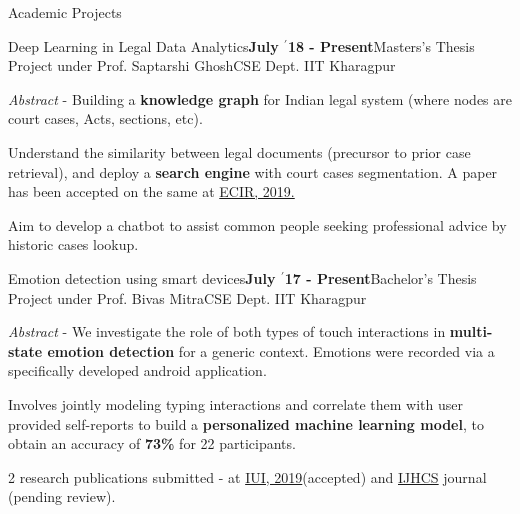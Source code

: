 \documentclass{resume} %
\begin{document}

\begin{rSection}{Academic Projects}

\begin{rSubsection}{ \large Deep Learning in Legal Data Analytics}{\textbf{\large July $^{\prime}$18 - Present}}{Masters's Thesis Project under Prof. Saptarshi Ghosh}{CSE Dept. IIT Kharagpur}
\item \textit{Abstract} - Building a \textbf{knowledge graph} for Indian legal system (where nodes are court cases, Acts, sections, etc).
\item Understand the similarity between legal documents (precursor to prior case retrieval), and deploy a \textbf{search engine} with court cases segmentation. A paper has been accepted on the same at \href{http://ecir2019.org}{ECIR, 2019.}
\item Aim to develop a chatbot to assist common people seeking professional advice by historic cases lookup.
\end{rSubsection}

\begin{rSubsection}{ \large Emotion detection using smart devices}{\textbf{\large July $^{\prime}$17 - Present}}{Bachelor's Thesis Project under Prof. Bivas Mitra}{CSE Dept. IIT Kharagpur}
\item \textit{Abstract} - We investigate the role of both types of touch interactions in \textbf{multi-state emotion detection} for a generic context. Emotions were recorded via a specifically developed android application.

\item Involves jointly modeling typing interactions and correlate them with user provided self-reports to build a \textbf{personalized machine learning model}, to obtain an accuracy of \textbf{73\%} for 22 participants.

\item 2 research publications submitted - at \href{https://iui.acm.org/2019}{IUI, 2019}(accepted) and \href{https://www.journals.elsevier.com/international-journal-of-human-computer-studies}{IJHCS} journal (pending review).
\end{rSubsection}


\end{rSection}
\end{document}
